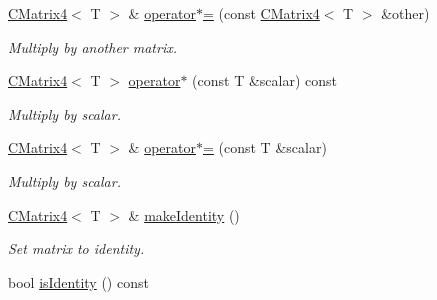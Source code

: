 \begin{DoxyCompactItemize}
\hyperlink{classirr_1_1core_1_1CMatrix4}{C\+Matrix4}$<$ T $>$ \& \hyperlink{classirr_1_1core_1_1CMatrix4_ac3d29f86c91d9d095ab155ecb8870f87}{operator$\ast$=} (const \hyperlink{classirr_1_1core_1_1CMatrix4}{C\+Matrix4}$<$ T $>$ \&other)
\begin{DoxyCompactList}\small\item\em Multiply by another matrix. \end{DoxyCompactList}\item 
\hyperlink{classirr_1_1core_1_1CMatrix4}{C\+Matrix4}$<$ T $>$ \hyperlink{classirr_1_1core_1_1CMatrix4_a2695d5d90aa8cf55e06649fc83752466}{operator$\ast$} (const T \&scalar) const \hypertarget{classirr_1_1core_1_1CMatrix4_a2695d5d90aa8cf55e06649fc83752466}{}\label{classirr_1_1core_1_1CMatrix4_a2695d5d90aa8cf55e06649fc83752466}

\begin{DoxyCompactList}\small\item\em Multiply by scalar. \end{DoxyCompactList}\item 
\hyperlink{classirr_1_1core_1_1CMatrix4}{C\+Matrix4}$<$ T $>$ \& \hyperlink{classirr_1_1core_1_1CMatrix4_ae78879a3d7f0113ba5208d5476c3af9c}{operator$\ast$=} (const T \&scalar)\hypertarget{classirr_1_1core_1_1CMatrix4_ae78879a3d7f0113ba5208d5476c3af9c}{}\label{classirr_1_1core_1_1CMatrix4_ae78879a3d7f0113ba5208d5476c3af9c}

\begin{DoxyCompactList}\small\item\em Multiply by scalar. \end{DoxyCompactList}\item 
\hyperlink{classirr_1_1core_1_1CMatrix4}{C\+Matrix4}$<$ T $>$ \& \hyperlink{classirr_1_1core_1_1CMatrix4_a45f876ed1aed2c3c98b87fee6d938604}{make\+Identity} ()\hypertarget{classirr_1_1core_1_1CMatrix4_a45f876ed1aed2c3c98b87fee6d938604}{}\label{classirr_1_1core_1_1CMatrix4_a45f876ed1aed2c3c98b87fee6d938604}

\begin{DoxyCompactList}\small\item\em Set matrix to identity. \end{DoxyCompactList}\item 
bool \hyperlink{classirr_1_1core_1_1CMatrix4_a24e7bc5d302f6c0cb11bad0771a40826}{is\+Identity} () const \hypertarget{classirr_1_1core_1_1CMatrix4_a24e7bc5d302f6c0cb11bad0771a40826}{}\label{classirr_1_1core_1_1CMatrix4_a24e7bc5d302f6c0cb11bad0771a40826}


\end{DoxyCompactItemize}

